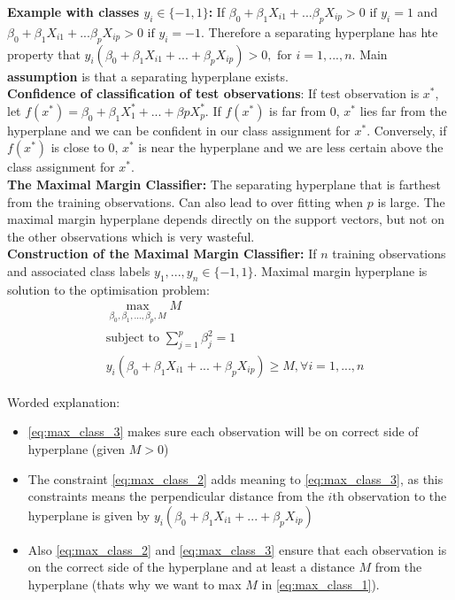 \documentclass[11pt]{article}
\begin{document}
\noindent \textbf{Example with classes $y_i \in \{ -1,1 \}$:} If $\beta_{0} + \beta_{1}X_{i1} + ... \beta_{p}X_{ip} > 0 \text{ if } y_i = 1$ and $\beta_{0} + \beta_{1}X_{i1} + ... \beta_{p}X_{ip} > 0 \text{ if } y_i = -1$. Therefore a separating hyperplane has hte property that $y_i(\beta_0 + \beta_1 X_{i1} + ... + \beta_p X_{ip}) > 0, \text{ for } i=1,...,n$. Main \textbf{assumption} is that a separating hyperplane exists. \\

\noindent \textbf{Confidence of classification of test observations}: If test observation is $x^*$, let $f(x^*) = \beta_{0} + \beta_{1}X_1^* + ... + \beta{p}X_{p}^*$. If $f(x^*)$ is far from $0$, $x^*$ lies far from the hyperplane and we can be confident in our class assignment for $x^*$. Conversely, if $f(x^*)$ is close to $0$, $x^*$ is near the hyperplane and we are less certain above the class assignment for $x^*$. \\

\noindent \textbf{The Maximal Margin Classifier:} The separating hyperplane that is farthest from the training observations. Can also lead to over fitting when $p$ is large. The maximal margin hyperplane depends directly on the support vectors, but not on the other observations which is very wasteful. \\

\noindent \textbf{Construction of the Maximal Margin Classifier:} If $n$ training observations and associated class labels $y_1,...,y_n \in \{ -1,1 \}$. Maximal margin hyperplane is solution to the optimisation problem:
\begin{align}
    &\max_{\beta_0,\beta_1,...,\beta_p,M}M \label{eq:max_class_1} \\
    &\text{subject to } \sum_{j=1}^{p}{\beta_{j}^{2}} = 1 \label{eq:max_class_2} \\
    &y_i(\beta_0 + \beta_1X_{i1} + ... + \beta_{p}X_{ip}) \geq M, \forall i=1,...,n \label{eq:max_class_3}
\end{align} 

\noindent Worded explanation: 
\begin{itemize}
    \item \eqref{eq:max_class_3} makes sure each observation will be on correct side of hyperplane (given $M>0$)
    \item The constraint \eqref{eq:max_class_2} adds meaning to \eqref{eq:max_class_3}, as this constraints means the perpendicular distance from the $i$th observation to the hyperplane is given by $y_i(\beta_0 + \beta_1X_{i1} + ... + \beta_p X_{ip})$
    \item Also \eqref{eq:max_class_2} and \eqref{eq:max_class_3} ensure that each observation is on the correct side of the hyperplane and at least a distance $M$ from the hyperplane (thats why we want to max $M$ in \eqref{eq:max_class_1}).
\end{itemize}
\end{document}
